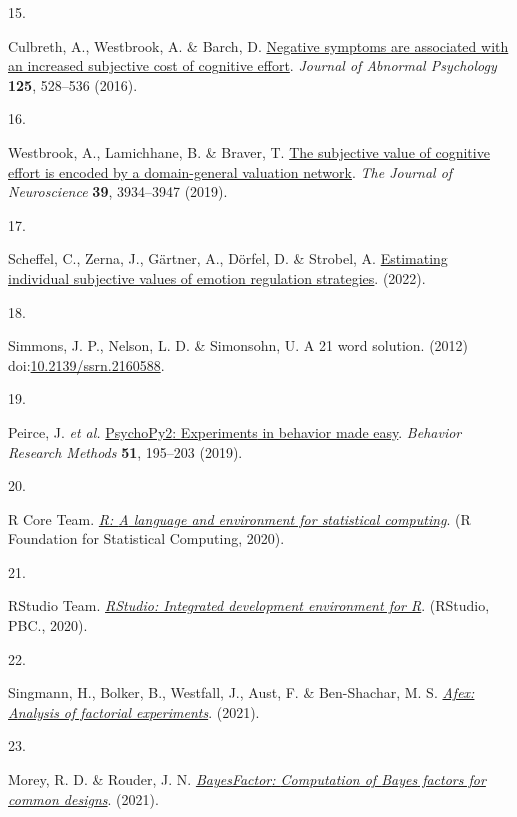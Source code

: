 \documentclass[
  man,floatsintext]{apa6}
\newlength{\cslhangindent}
\newlength{\csllabelwidth}
\newlength{\cslentryspacingunit} %
\newenvironment{CSLReferences}[2] %
 {%
  \setlength{\parindent}{0pt}
  \ifodd #1
  \let\oldpar\par
  \def\par{\hangindent=\cslhangindent\oldpar}
  \fi
  \setlength{\parskip}{#2\cslentryspacingunit}
 }%
 {}
\newcommand{\CSLLeftMargin}[1]{\parbox[t]{\csllabelwidth}{#1}}
\newcommand{\CSLRightInline}[1]{\parbox[t]{\linewidth - \csllabelwidth}{#1}\break}
\begin{document}
\begin{CSLReferences}{0}{0}
\leavevmode{}%
\CSLLeftMargin{15. }%
\CSLRightInline{Culbreth, A., Westbrook, A. \& Barch, D. \href{https://doi.org/10.1037/abn0000153}{Negative symptoms are associated with an increased subjective cost of cognitive effort}. \emph{Journal of Abnormal Psychology} \textbf{125}, 528--536 (2016).}

\leavevmode{}%
\CSLLeftMargin{16. }%
\CSLRightInline{Westbrook, A., Lamichhane, B. \& Braver, T. \href{https://doi.org/10.1523/jneurosci.3071-18.2019}{The subjective value of cognitive effort is encoded by a domain-general valuation network}. \emph{The Journal of Neuroscience} \textbf{39}, 3934--3947 (2019).}

\leavevmode{}%
\CSLLeftMargin{17. }%
\CSLRightInline{Scheffel, C., Zerna, J., Gärtner, A., Dörfel, D. \& Strobel, A. \href{https://psyarxiv.com/wr8qx}{Estimating individual subjective values of emotion regulation strategies}. (2022).}

\leavevmode{}%
\CSLLeftMargin{18. }%
\CSLRightInline{Simmons, J. P., Nelson, L. D. \& Simonsohn, U. A 21 word solution. (2012) doi:\href{https://doi.org/10.2139/ssrn.2160588}{10.2139/ssrn.2160588}.}

\leavevmode{}%
\CSLLeftMargin{19. }%
\CSLRightInline{Peirce, J. \emph{et al.} \href{https://doi.org/10.3758/s13428-018-01193-y}{{PsychoPy2}: {Experiments} in behavior made easy}. \emph{Behavior Research Methods} \textbf{51}, 195--203 (2019).}

\leavevmode{}%
\CSLLeftMargin{20. }%
\CSLRightInline{R Core Team. \emph{\href{https://www.R-project.org/}{R: {A} language and environment for statistical computing}}. (R Foundation for Statistical Computing, 2020).}

\leavevmode{}%
\CSLLeftMargin{21. }%
\CSLRightInline{RStudio Team. \emph{\href{http://www.rstudio.com/}{{RStudio: Integrated development environment for R}}}. (RStudio, PBC., 2020).}

\leavevmode{}%
\CSLLeftMargin{22. }%
\CSLRightInline{Singmann, H., Bolker, B., Westfall, J., Aust, F. \& Ben-Shachar, M. S. \emph{\href{https://CRAN.R-project.org/package=afex}{Afex: {A}nalysis of factorial experiments}}. (2021).}

\leavevmode{}%
\CSLLeftMargin{23. }%
\CSLRightInline{Morey, R. D. \& Rouder, J. N. \emph{\href{https://CRAN.R-project.org/package=BayesFactor}{{BayesFactor}: {Computation} of {Bayes} factors for common designs}}. (2021).}


\end{CSLReferences}
\end{document}
